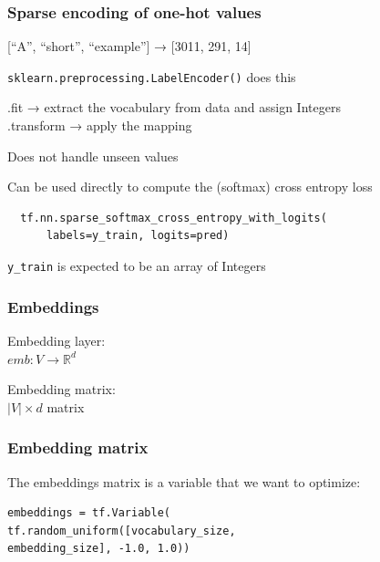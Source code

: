 \documentclass{beamer}
\begin{document}
\begin{frame}[fragile]
  \frametitle{Sparse encoding of one-hot values}

  [``A'', ``short'', ``example''] → [3011, 291, 14]
  \vspace{2ex}

  \lstinline{sklearn.preprocessing.LabelEncoder()} does this

  \pause
  .fit → extract the vocabulary from data and assign Integers\\
  .transform → apply the mapping

  \pause
  \textcolor{reduhh}{Does not handle unseen values}

  \pause
  \vspace{2ex}
  Can be used directly to compute the (softmax) cross entropy loss
\begin{lstlisting}
  tf.nn.sparse_softmax_cross_entropy_with_logits(
      labels=y_train, logits=pred)
\end{lstlisting}

  \lstinline{y_train} is expected to be an array of Integers

   
\end{frame}



%
%  
%  


\begin{frame}
  \frametitle{Embeddings}

  Embedding layer:\\$emb: V → \mathbb{R}^d$

  \vspace{2ex}
  Embedding matrix:\\$\left| V \right| \times d$ matrix
  
\end{frame}


 \begin{frame}[fragile]
  \frametitle{Embedding matrix}
  The embeddings matrix is a variable that we want to optimize:
  \begin{lstlisting}
embeddings = tf.Variable(
tf.random_uniform([vocabulary_size,
embedding_size], -1.0, 1.0))
\end{lstlisting}    
\end{frame}
\end{document}
